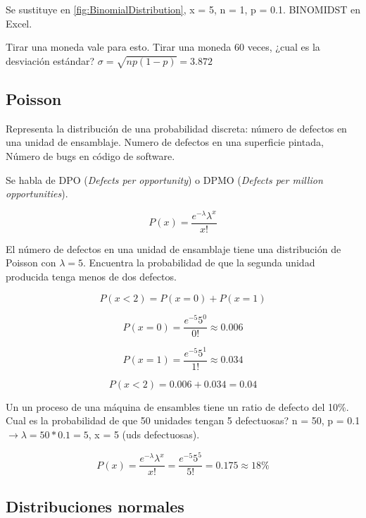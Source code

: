 \documentclass[]{article}
\begin{document}
Se sustituye en \ref{fig:BinomialDistribution}, x = 5, n = 1, p = 0.1. BINOMIDST en Excel.

Tirar una moneda vale para esto. Tirar una moneda 60 veces, ¿cual es la desviación estándar? $\sigma = \sqrt{np(1-p)} = 3.872$ 

\subsection{Poisson}

Representa la distribución de una probabilidad discreta: número de defectos en una unidad de ensamblaje. Numero de defectos en una superficie pintada, Número de bugs en código de software.

Se habla de DPO (\textit{Defects per opportunity}) o DPMO (\textit{Defects per million opportunities}).

\begin{equation}
P(x)= \frac{e^{-\lambda}\lambda^x}{x!}
\end{equation}

El número de defectos en una unidad de ensamblaje tiene una distribución de Poisson con $\lambda = 5$. Encuentra la probabilidad de que la segunda unidad producida  tenga menos de dos defectos.

\begin{equation}
P(x < 2) = P(x=0)+P(x=1)
\end{equation}

\begin{equation}
P(x = 0) = \frac{e^{-5}5^0}{0!} \approx 0.006
\end{equation}

\begin{equation}
P(x = 1) = \frac{e^{-5}5^1}{1!} \approx 0.034
\end{equation}

\begin{equation}
P(x < 2) = 0.006 + 0.034 = 0.04
\end{equation}

Un un proceso de una máquina de ensambles tiene un ratio de defecto del 10\%. Cual es la probabilidad de que 50 unidades tengan 5 defectuosas? n = 50, p = 0.1 $\longrightarrow \lambda = 50*0.1 = 5$, x = 5 (uds defectuosas).

\begin{equation}
P(x) = \frac{e^{-\lambda}\lambda^x}{x!} = \frac{e^{-5}5^5}{5!} = 0.175 \approx 18\%
\end{equation} 

\subsection{Distribuciones normales}
\end{document}
